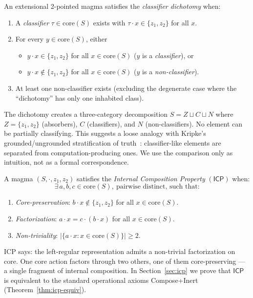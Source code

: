 \documentclass[a4paper,UKenglish,cleveref,autoref,thm-restate]{lipics-v2021}
\newcommand{\dotop}{\cdot}
\newcommand{\ICP}{\textsf{ICP}}
\newcommand{\core}{\mathrm{core}}
\begin{document}
\begin{definition}
\label{def:cd}
An extensional 2-pointed magma satisfies the \emph{classifier dichotomy} when:
\begin{enumerate}
  \item A \emph{classifier} $\tau \in \core(S)$ exists with $\tau \dotop x \in \{z_1, z_2\}$ for all $x$.
  \item For every $y \in \core(S)$, either
    \begin{itemize}
      \item $y \dotop x \in \{z_1, z_2\}$ for all $x \in \core(S)$ \quad ($y$ is a \emph{classifier}), or
      \item $y \dotop x \notin \{z_1, z_2\}$ for all $x \in \core(S)$ \quad ($y$ is a \emph{non-classifier}).
    \end{itemize}
  \item At least one non-classifier exists (excluding the degenerate case where the ``dichotomy'' has only one inhabited class).
\end{enumerate}
\end{definition}

The dichotomy creates a three-category decomposition $S = Z \sqcup C \sqcup N$ where $Z = \{z_1, z_2\}$ (absorbers), $C$ (classifiers), and $N$ (non-classifiers). No element can be partially classifying. This suggests a loose analogy with Kripke's grounded/ungrounded stratification of truth~\cite{kripke75}: classifier-like elements are separated from computation-producing ones. We use the comparison only as intuition, not as a formal correspondence.

\begin{definition}
\label{def:icp}
A magma $(S, \dotop, z_1, z_2)$ satisfies the \emph{Internal Composition Property} $(\ICP)$ when:
\[
\exists\, a, b, c \in \core(S),\ \text{pairwise distinct, such that:}
\]
\begin{enumerate}
  \item \emph{Core-preservation}: $b \dotop x \notin \{z_1, z_2\}$ for all $x \in \core(S)$.
  \item \emph{Factorization}: $a \dotop x = c \dotop (b \dotop x)$ for all $x \in \core(S)$.
  \item \emph{Non-triviality}: $|\{a \dotop x : x \in \core(S)\}| \geq 2$.
\end{enumerate}
\end{definition}

ICP says: the left-regular representation admits a non-trivial factorization on core. One core action factors through two others, one of them core-preserving --- a single fragment of internal composition. In Section~\ref{sec:icp} we prove that $\ICP$ is equivalent to the standard operational axioms Compose+Inert (Theorem~\ref{thm:icp-equiv}).
\end{document}

